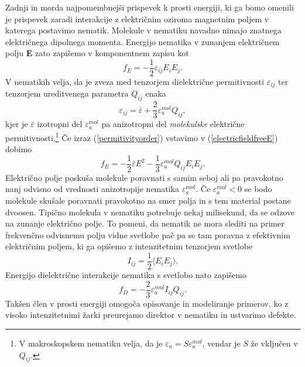 \documentclass[longbibliography,slovene,a4paper,12pt]{book}
\begin{document}
Zadnji in morda najpomembnejši prispevek k prosti energiji, ki ga bomo omenili je prispevek zaradi interakcije z električnim oziroma magnetnim poljem v katerega postavimo nematik. Molekule v nematiku navadno nimajo znatnega električnega dipolnega momenta. Energijo nematika v zunanjem električnem polju $\mathbf{E}$ zato zapišemo v komponentnem zapisu kot
\begin{equation}
f_E = -\frac{1}{2}\varepsilon_{ij} E_iE_j.
\label{electricfieldfreeE}
\end{equation}
V nematikih velja, da je zveza med tenzorjem dielektrične permitivnosti $\varepsilon_{ij}$ ter tenzorjem ureditvenega parametra $Q_{ij}$ enaka
\begin{equation}
\varepsilon_{ij} = \bar \varepsilon + \frac{2}{3} \varepsilon_{a}^{mol} Q_{ij},
\label{permitivityorder}
\end{equation}
kjer je $\bar \varepsilon$ izotropni del $\varepsilon_{a}^{mol}$ pa anizotropni del \emph{molekulske} električne permitivnosti.\footnote{V makroskopskem nematiku velja, da je $\varepsilon_a =S \varepsilon_{a}^{mol}$, vendar je $S$ že vključen v $Q_{ij}$.} Če izraz (\ref{permitivityorder}) vstavimo v (\ref{electricfieldfreeE}) dobimo
\begin{equation}
f_E = -\frac{1}{2}\bar \varepsilon E^2 - \frac{1}{3} \varepsilon_a^{mol} Q_{ij} E_i E_j.
\end{equation}
Električno polje poskuša molekule poravnati s samim seboj ali pa pravokotno nanj odvisno od vrednosti anizotropije nematika $\varepsilon_a^{mol}$. Če $\varepsilon_a^{mol}<0$ se bodo molekule skušale poravnati pravokotno na smer polja in s tem material postane dvoosen\cite{gramsbergen}. Tipično molekula v nematiku potrebuje nekaj milisekund, da se odzove na zunanje električno polje. To pomeni, da nematik ne mora slediti na primer frekvenčno odvisnemu polju vidne svetlobe pač pa se tam poravna z efektivnim električnim poljem, ki ga opišemo z intenzitetnim tenzorjem svetlobe
\begin{equation}
I_{ij} = \frac{1}{2} \langle E_i E_j \rangle.
\end{equation}
Energijo dielektrične interakcije nematika s svetlobo nato zapišemo
\begin{equation}
f_D = -\frac{2}{3}\varepsilon_{a}^{mol} I_{ij}Q_{ij}.
\end{equation}
Takšen člen v prosti energiji omogoča opisovanje in modeliranje primerov, ko z visoko intenzitetnimi žarki preurejamo direktor v nematiku in ustvarimo defekte\cite{cancula,cancula2}.
\end{document}
